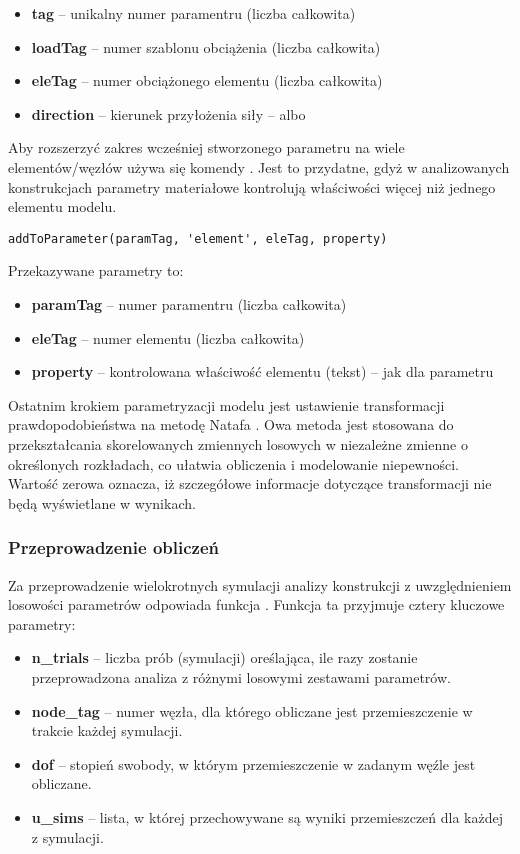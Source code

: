 \begin{itemize}
    \item \textbf{tag} – unikalny numer paramentru (liczba całkowita)
    \item \textbf{loadTag} – numer szablonu obciążenia (liczba całkowita)
    \item \textbf{eleTag} – numer obciążonego elementu (liczba całkowita)
    \item \textbf{direction} – kierunek przyłożenia siły –  albo 
\end{itemize}

Aby rozszerzyć zakres wcześniej stworzonego parametru na wiele elementów/węzłów używa się komendy
. Jest to przydatne, gdyż w analizowanych konstrukcjach
parametry materiałowe kontrolują właściwości więcej niż jednego elementu modelu.

\begin{lstlisting}
addToParameter(paramTag, 'element', eleTag, property)
\end{lstlisting}
Przekazywane parametry to:
\begin{itemize}
    \item \textbf{paramTag} – numer paramentru (liczba całkowita)
    \item \textbf{eleTag} – numer elementu (liczba całkowita)
    \item \textbf{property} – kontrolowana właściwość elementu (tekst) – jak dla parametru
\end{itemize}
Ostatnim krokiem parametryzacji modelu jest ustawienie transformacji prawdopodobieństwa na metodę Natafa .
Owa metoda jest stosowana do przekształcania skorelowanych zmiennych losowych w niezależne zmienne o określonych rozkładach, co ułatwia obliczenia i modelowanie niepewności.
Wartość zerowa oznacza, iż szczegółowe informacje dotyczące transformacji nie będą wyświetlane w wynikach.

\subsubsection{Przeprowadzenie obliczeń}

Za przeprowadzenie wielokrotnych symulacji analizy konstrukcji z uwzględnieniem losowości parametrów odpowiada funkcja . Funkcja ta przyjmuje cztery kluczowe parametry:

\begin{itemize}
    \item \textbf{n\_trials} – liczba prób (symulacji) oreślająca, ile razy zostanie przeprowadzona analiza z różnymi losowymi zestawami parametrów.
    \item \textbf{node\_tag} – numer węzła, dla którego obliczane jest przemieszczenie w trakcie każdej symulacji.
    \item \textbf{dof} – stopień swobody, w którym przemieszczenie w zadanym węźle jest obliczane.
    \item \textbf{u\_sims} – lista, w której przechowywane są wyniki przemieszczeń dla każdej z symulacji.
\end{itemize}

